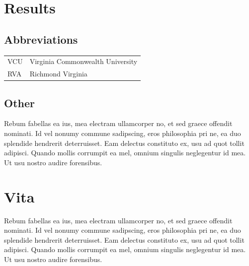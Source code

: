\documentclass[copyright, reqno]{vcuthesis}
\numberwithin{equation}{chapter}
\begin{document}
\chapter{Results \label{chap:resultschap}}

\begin{appendices}
\chapter{Abbreviations}
\begin{tabular}{ll}
VCU &Virginia Commonwealth University \\
RVA & Richmond Virginia \\
\end{tabular}
\end{appendices}

\begin{appendices}
\chapter{Other}
Rebum fabellas ea ius, mea electram ullamcorper no, et sed graece offendit nominati. Id vel nonumy commune sadipscing, eros philosophia pri ne, ea duo splendide hendrerit deterruisset. Eam delectus constituto ex, usu ad quot tollit adipisci. Quando mollis corrumpit ea mel, omnium singulis neglegentur id mea. Ut usu nostro audire forensibus.
\end{appendices}

\printbibliography[title={References}, heading=bibintoc]

\chapter*{Vita}
\thispagestyle{plain}
Rebum fabellas ea ius, mea electram ullamcorper no, et sed graece offendit nominati. Id vel nonumy commune sadipscing, eros philosophia pri ne, ea duo splendide hendrerit deterruisset. Eam delectus constituto ex, usu ad quot tollit adipisci. Quando mollis corrumpit ea mel, omnium singulis neglegentur id mea. Ut usu nostro audire forensibus.
\end{document}
